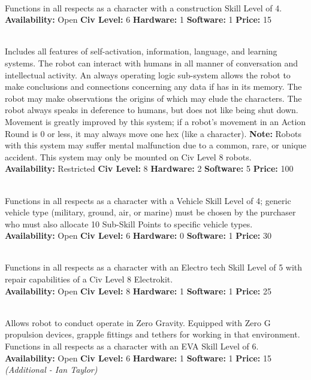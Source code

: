 \\ 
Functions in all respects as a character with a construction Skill Level of 4. 
\\
\textbf{Availability:} Open \textbf{Civ Level:} 6 \textbf{Hardware:} 1 \textbf{Software:} 1 \textbf{Price:} 15 

\\
 Includes all features of self-activation, information, language, and
learning systems. The robot can interact with humans in all manner of
conversation and intellectual activity. An always operating logic
sub-system allows the robot to make conclusions and connections
concerning any data if has in its memory. The robot may make
observations the origins of which may elude the characters. The robot
always speaks in deference to humans, but does not like being shut
down. Movement is greatly improved by this system; if a robot's
movement in an Action Round is 0 or less, it may always move one hex
(like a character).
\textbf{Note:} Robots with this system may suffer mental malfunction
due to a common, rare, or unique accident. This system may only be
mounted on Civ Level 8 robots.\\
\textbf{Availability:} Restricted \textbf{Civ Level:} 8
 \textbf{Hardware:} 2 \textbf{Software:} 5
 \textbf{Price:} 100  

\\
Functions in all respects as a character with a Vehicle Skill Level of
4; generic vehicle type (military, ground, air, or marine) must be  
chosen by the purchaser who must also allocate 10 Sub-Skill Points to
specific vehicle types.  
\\
\textbf{Availability:} Open \textbf{Civ Level:} 6 \textbf{Hardware:} 0 \textbf{Software:} 1 \textbf{Price:} 30  

\\
Functions in all respects as a character with an Electro tech Skill
Level of 5 with repair capabilities of a Civ Level 8 Electrokit.  
\\
\textbf{Availability:} Open \textbf{Civ Level:} 8 \textbf{Hardware:} 1 \textbf{Software:} 1 \textbf{Price:} 25  

\\
Allows robot to conduct operate in Zero Gravity. Equipped with Zero G
propulsion devices, grapple fittings and tethers for working in  
that environment. Functions in all respects as a character with an EVA
Skill Level of 6.  
\\
\textbf{Availability:} Open \textbf{Civ Level:} 6 \textbf{Hardware:} 1 \textbf{Software:} 1 \textbf{Price:} 15  \\
\emph{(Additional - Ian Taylor)}

